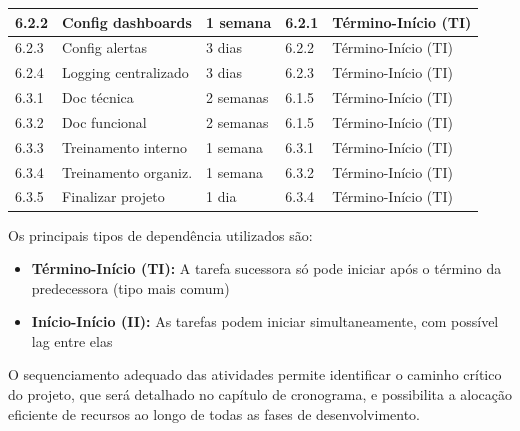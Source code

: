 \begin{table}[H]
\begin{tabular}{|p{1cm}|p{5cm}|p{2cm}|p{1.5cm}|p{3cm}|}
6.2.2 & Config dashboards & 1 semana & 6.2.1 & Término-Início (TI) \\ \hline
6.2.3 & Config alertas & 3 dias & 6.2.2 & Término-Início (TI) \\ \hline
6.2.4 & Logging centralizado & 3 dias & 6.2.3 & Término-Início (TI) \\ \hline
6.3.1 & Doc técnica & 2 semanas & 6.1.5 & Término-Início (TI) \\ \hline
6.3.2 & Doc funcional & 2 semanas & 6.1.5 & Término-Início (TI) \\ \hline
6.3.3 & Treinamento interno & 1 semana & 6.3.1 & Término-Início (TI) \\ \hline
6.3.4 & Treinamento organiz. & 1 semana & 6.3.2 & Término-Início (TI) \\ \hline
6.3.5 & Finalizar projeto & 1 dia & 6.3.4 & Término-Início (TI) \\ \hline
\end{tabular}
\end{table}

Os principais tipos de dependência utilizados são:

\begin{itemize}
    \item \textbf{Término-Início (TI):} A tarefa sucessora só pode iniciar após o término da predecessora (tipo mais comum)
    \item \textbf{Início-Início (II):} As tarefas podem iniciar simultaneamente, com possível lag entre elas
\end{itemize}

O sequenciamento adequado das atividades permite identificar o caminho crítico do projeto, que será detalhado no capítulo de cronograma, e possibilita a alocação eficiente de recursos ao longo de todas as fases de desenvolvimento.

